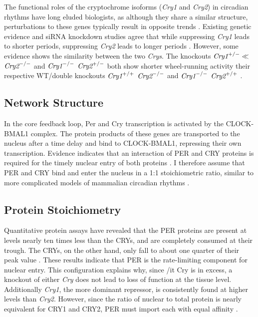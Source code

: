 The functional roles of the cryptochrome isoforms ({\it Cry1} and {\it Cry2}) in circadian rhythms have long eluded biologists, as although they share a similar structure, perturbations to these genes typically result in opposite trends \cite{McCarthy2009}.
 Existing genetic evidence and siRNA knockdown studies agree that while suppressing {\it Cry1} leads to shorter periods, suppressing {\it Cry2} leads to longer periods \cite{VanderHorst1999, Zhang2009}.
 However, some evidence shows the similarity between the two {\it Crys}.
 The knockouts $\text{\it Cry1}^{+/-}\ll$ $\text{\it Cry2}^{-/-}$ and $\text{\it Cry1}^{-/-}$ $\text{\it Cry2}^{+/-}$ both show shorter wheel-running activity their respective WT/double knockouts $\text{\it Cry1}^{+/+}$ $\text{\it Cry2}^{-/-}$ and $\text{\it Cry1}^{-/-}$ $\text{\it Cry2}^{+/+}$ \cite{VanderHorst1999}.


\subsection{Network Structure}
In the core feedback loop, Per and Cry transcription is activated by the CLOCK-BMAL1 complex.
 The protein products of these genes are transported to the nucleus after a time delay and bind to CLOCK-BMAL1, repressing their own transcription.
 Evidence indicates that an interaction of PER and CRY proteins is required for the timely nuclear entry of both proteins \cite{Miyazaki2001,Ko2006,Kume1999}.
 I therefore assume that PER and CRY bind and enter the nucleus in a 1:1 stoichiometric ratio, similar to more complicated models of mammalian circadian rhythms \cite{Leloup2003,Mirsky2009,Forger2003}.

\subsection{Protein Stoichiometry} Quantitative protein assays have revealed that the PER proteins are present at levels nearly ten times less than the CRYs, and are completely consumed at their trough. The CRYs, on the other hand, only fall to about one quarter of their peak value  \cite{Lee2001}. These results indicate that PER is the rate-limiting component for nuclear entry. This configuration explains why, since {/it Cry} is in excess, a knockout of either {\it Cry} does not lead to loss of function at the tissue level. Additionally {\it Cry1}, the more dominant repressor, is consistently found at higher levels than {\it Cry2}. However, since the ratio of nuclear to total protein is nearly equivalent for CRY1 and CRY2, PER must import each with equal affinity \cite{Lee2001,Lee2011b}.

